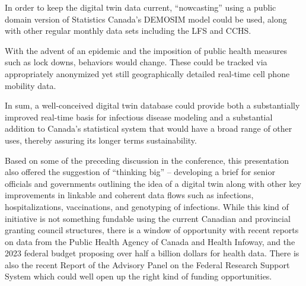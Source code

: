 In order to keep the digital twin data current, ``nowcasting'' using a
public domain version of Statistics Canada's DEMOSIM model could be
used, along with other regular monthly data sets including the LFS and
CCHS.

With the advent of an epidemic and the imposition of public health
measures such as lock downs, behaviors would change. These could be
tracked via appropriately anonymized yet still geographically detailed
real-time cell phone mobility data.

In sum, a well-conceived digital twin database could provide both a
substantially improved real-time basis for infectious disease modeling
and a substantial addition to Canada's statistical system that would
have a broad range of other uses, thereby assuring its longer terms
sustainability.

Based on some of the preceding discussion in the conference, this
presentation also offered the suggestion of ``thinking big'' --
developing a brief for senior officials and governments outlining the
idea of a digital twin along with other key improvements in linkable and
coherent data flows such as infections, hospitalizations, vaccinations,
and genotyping of infections. While this kind of initiative is not
something fundable using the current Canadian and provincial granting
council structures, there is a window of opportunity with recent reports
on data from the Public Health Agency of Canada and Health Infoway, and
the 2023 federal budget proposing over half a billion dollars for health
data. There is also the recent Report of the Advisory Panel on the
Federal Research Support System which could well open up the right kind
of funding opportunities.
